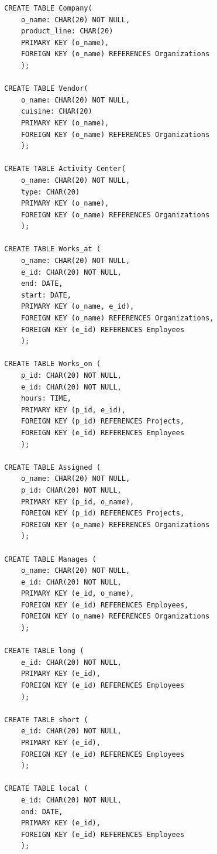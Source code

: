 \begin{enumerate}[label = {(\alph*)}]
\begin{verbatim}
        CREATE TABLE Company(
            o_name: CHAR(20) NOT NULL,
            product_line: CHAR(20)
            PRIMARY KEY (o_name),
            FOREIGN KEY (o_name) REFERENCES Organizations 
            );
            
        CREATE TABLE Vendor(
            o_name: CHAR(20) NOT NULL,
            cuisine: CHAR(20)
            PRIMARY KEY (o_name),
            FOREIGN KEY (o_name) REFERENCES Organizations 
            );
            
        CREATE TABLE Activity Center(
            o_name: CHAR(20) NOT NULL,
            type: CHAR(20)
            PRIMARY KEY (o_name),
            FOREIGN KEY (o_name) REFERENCES Organizations 
            );
        
        CREATE TABLE Works_at (
            o_name: CHAR(20) NOT NULL,
            e_id: CHAR(20) NOT NULL,
            end: DATE,
            start: DATE,
            PRIMARY KEY (o_name, e_id),
            FOREIGN KEY (o_name) REFERENCES Organizations,
            FOREIGN KEY (e_id) REFERENCES Employees
            );
        
        CREATE TABLE Works_on (
            p_id: CHAR(20) NOT NULL,
            e_id: CHAR(20) NOT NULL,
            hours: TIME,
            PRIMARY KEY (p_id, e_id),
            FOREIGN KEY (p_id) REFERENCES Projects,
            FOREIGN KEY (e_id) REFERENCES Employees
            );
            
        CREATE TABLE Assigned (
            o_name: CHAR(20) NOT NULL,
            p_id: CHAR(20) NOT NULL,
            PRIMARY KEY (p_id, o_name),
            FOREIGN KEY (p_id) REFERENCES Projects,
            FOREIGN KEY (o_name) REFERENCES Organizations
            );
            
        CREATE TABLE Manages (
            o_name: CHAR(20) NOT NULL,
            e_id: CHAR(20) NOT NULL,
            PRIMARY KEY (e_id, o_name),
            FOREIGN KEY (e_id) REFERENCES Employees,
            FOREIGN KEY (o_name) REFERENCES Organizations
            );
        
        CREATE TABLE long (
            e_id: CHAR(20) NOT NULL,
            PRIMARY KEY (e_id),
            FOREIGN KEY (e_id) REFERENCES Employees
            );
            
        CREATE TABLE short (
            e_id: CHAR(20) NOT NULL,
            PRIMARY KEY (e_id),
            FOREIGN KEY (e_id) REFERENCES Employees
            );
            
        CREATE TABLE local (
            e_id: CHAR(20) NOT NULL,
            end: DATE,
            PRIMARY KEY (e_id),
            FOREIGN KEY (e_id) REFERENCES Employees
            );
            

\end{verbatim}
\end{enumerate}
